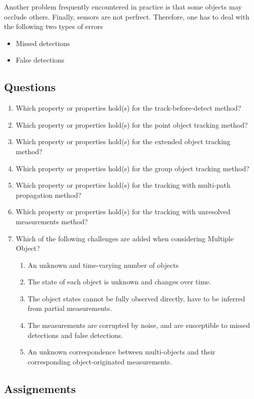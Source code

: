 Another problem frequently encountered in practice is that some objects may occlude others. Finally, sensors are not perfrect. Therefore, one
has to deal with the following two types of errors

\begin{itemize}
\item Missed detections
\item False detections
\end{itemize}

\subsection{Questions}

\begin{enumerate}
\item Which property or properties hold(s) for the track-before-detect method?
\item Which property or properties hold(s) for the point object tracking method?
\item Which property or properties hold(s) for the extended object tracking method?
\item Which property or properties hold(s) for the group object tracking method?
\item Which property or properties hold(s) for the tracking with multi-path propagation method?
\item Which property or properties hold(s) for the tracking with unresolved measurements method?
\item Which of the following challenges are added when considering Multiple Object?
\begin{enumerate}
\item An unknown and time-varying number of objects
\item The state of each object is unknown and changes over time. 
\item The object states cannot be fully observed directly, have to be inferred from partial measurements.
\item The measurements are corrupted by noise, and are susceptible to missed detections and false detections. 
\item An unknown correspondence between multi-objects and their corresponding object-originated measurements. 
\end{enumerate}
\end{enumerate}

\subsection{Assignements}
